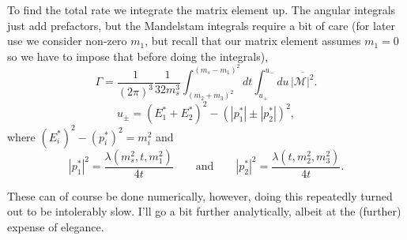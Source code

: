 \documentclass[11pt, a4paper]{article}
\begin{document}
To find the total rate we integrate the matrix element up. The angular integrals just add prefactors, but the Mandelstam integrals require a bit of care (for later use we consider non-zero $m_1$, but recall that our matrix element assumes $m_1=0$ so we have to impose that before doing the integrals),
%
%
%
\[  \Gamma = \frac{1}{(2\pi)^3}\frac{1}{32m^3_s}\int_{(m_2+m_3)^2}^{(m_s-m_1)^2}dt\int_{u_+}^{u_-}du\,\overline{\left|\mathcal{M}\right|^2}. \]
%
\[ u_\pm = \left(E_1^* + E_2^*\right)^2 - \left(|p_1^*| \pm |p_2^*|\right)^2, \]
%
where $\left(E^*_i\right)^2 - \left(p^*_i\right)^2 = m_i^2$ and 
%
\[   |p^*_1|^2 = \frac{\lambda(m_s^2,t,m_1^2)}{4t} \qquad\text{and}\qquad  |p^*_2|^2 = \frac{\lambda(t,m_2^2,m_3^2)}{4t}. \]
%

These can of course be done numerically, however, doing this repeatedly turned
out to be intolerably slow. I'll go a bit further analytically, albeit
at the (further) expense of elegance.
\end{document}
